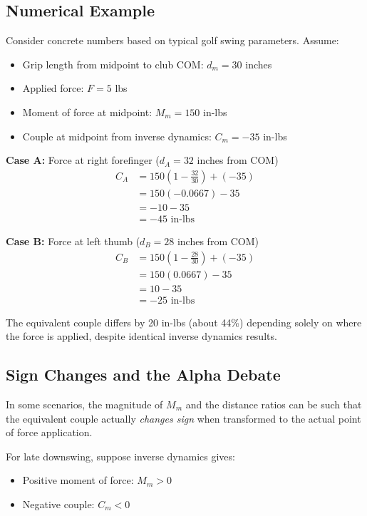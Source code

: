 \documentclass[11pt,a4paper]{article}
\begin{document}
\subsection{Numerical Example}

Consider concrete numbers based on typical golf swing parameters. Assume:
\begin{itemize}
    \item Grip length from midpoint to club COM: $d_m = 30$ inches
    \item Applied force: $F = 5$ lbs
    \item Moment of force at midpoint: $M_m = 150$ in-lbs
    \item Couple at midpoint from inverse dynamics: $C_m = -35$ in-lbs
\end{itemize}

\textbf{Case A:} Force at right forefinger ($d_A = 32$ inches from COM)
\begin{align}
C_A &= 150 \left(1 - \frac{32}{30}\right) + (-35) \\
    &= 150(-0.0667) - 35 \\
    &= -10 - 35 \\
    &= -45 \text{ in-lbs}
\end{align}

\textbf{Case B:} Force at left thumb ($d_B = 28$ inches from COM)  
\begin{align}
C_B &= 150 \left(1 - \frac{28}{30}\right) + (-35) \\
    &= 150(0.0667) - 35 \\
    &= 10 - 35 \\
    &= -25 \text{ in-lbs}
\end{align}

The equivalent couple differs by 20 in-lbs (about 44\%) depending solely on where the force is applied, despite identical inverse dynamics results.

\subsection{Sign Changes and the Alpha Debate}

In some scenarios, the magnitude of $M_m$ and the distance ratios can be such that the equivalent couple actually \emph{changes sign} when transformed to the actual point of force application.

For late downswing, suppose inverse dynamics gives:
\begin{itemize}
    \item Positive moment of force: $M_m > 0$  
    \item Negative couple: $C_m < 0$
\end{itemize}
\end{document}
